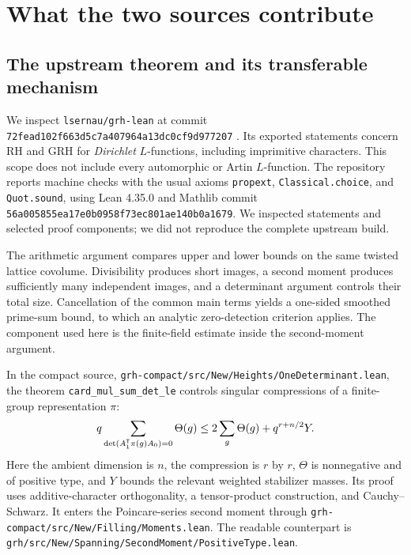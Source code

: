 \section{What the two sources contribute}\label{sec:sources}

\subsection{The upstream theorem and its transferable mechanism}

We inspect \texttt{lsernau/grh-lean} at commit
\texttt{72fead102f663d5c7a407964a13dc0cf9d977207} \cite{Sernau}.
Its exported statements concern RH and GRH for \emph{Dirichlet}
$L$-functions, including imprimitive characters. This scope does not
include every automorphic or Artin $L$-function. The repository reports
machine checks with the usual axioms \texttt{propext},
\texttt{Classical.choice}, and \texttt{Quot.sound}, using Lean 4.35.0 and
Mathlib commit \texttt{56a005855ea17e0b0958f73ec801ae140b0a1679}.
We inspected statements and selected proof components; we did not reproduce
the complete upstream build.

The arithmetic argument compares upper and lower bounds on the same
twisted lattice covolume. Divisibility produces short images, a second
moment produces sufficiently many independent images, and a determinant
argument controls their total size. Cancellation of the common main terms
yields a one-sided smoothed prime-sum bound, to which an analytic
zero-detection criterion applies. The component used here is the
finite-field estimate inside the second-moment argument.

In the compact source,
\texttt{grh-compact/src/New/Heights/OneDeterminant.lean},
the theorem \texttt{card\_mul\_sum\_det\_le} controls singular compressions
of a finite-group representation $\pi$:
\begin{equation}\label{eq:source}
 q\sum_{\det(A_1^{\mathsf T}\pi(g)A_0)=0}\Theta(g)
 \le 2\sum_g\Theta(g)+q^{r+n/2}Y.
\end{equation}
Here the ambient dimension is $n$, the compression is $r$ by $r$,
$\Theta$ is nonnegative and of positive type, and $Y$ bounds the relevant
weighted stabilizer masses. Its proof uses additive-character
orthogonality, a tensor-product construction, and Cauchy--Schwarz.
It enters the Poincare-series second moment through
\texttt{grh-compact/src/New/Filling/Moments.lean}.
The readable counterpart is
\texttt{grh/src/New/Spanning/SecondMoment/PositiveType.lean}.

